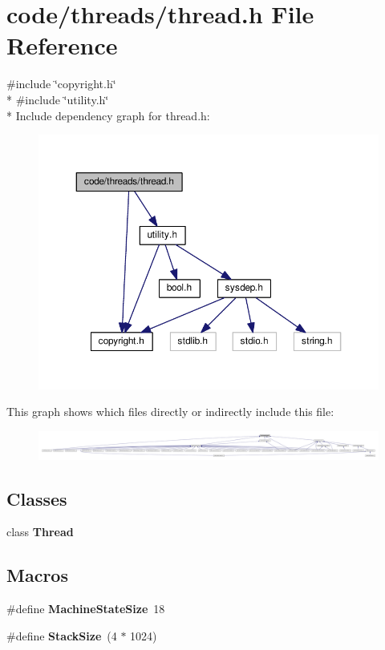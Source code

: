 \section{code/threads/thread.h File Reference}
\label{thread_8h}
{\ttfamily \#include \char`\"{}copyright.\+h\char`\"{}}\\*
{\ttfamily \#include \char`\"{}utility.\+h\char`\"{}}\\*
Include dependency graph for thread.\+h\+:
\nopagebreak
\begin{figure}[H]
\begin{center}
\leavevmode
\includegraphics[width=350pt]{thread_8h__incl}
\end{center}
\end{figure}
This graph shows which files directly or indirectly include this file\+:
\nopagebreak
\begin{figure}[H]
\begin{center}
\leavevmode
\includegraphics[width=350pt]{thread_8h__dep__incl}
\end{center}
\end{figure}
\subsection*{Classes}
\begin{DoxyCompactItemize}
\item 
class {\bf Thread}
\end{DoxyCompactItemize}
\subsection*{Macros}
\begin{DoxyCompactItemize}
\item 
\#define {\bf Machine\+State\+Size}~18
\item 
\#define {\bf Stack\+Size}~(4 $\ast$ 1024)
\end{DoxyCompactItemize}
